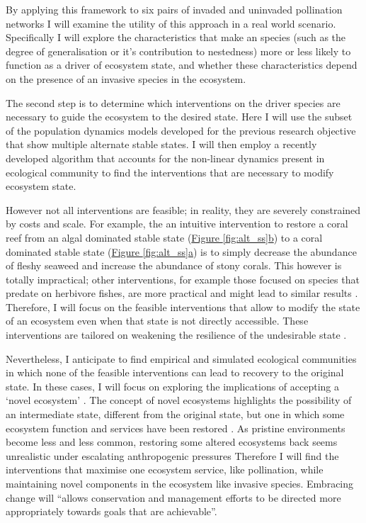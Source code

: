 \documentclass[a4paper]{article}
\begin{document}
By applying this framework to six pairs of invaded and uninvaded pollination networks \cite{Bartomeus2008} I will examine the utility of this approach in a real world scenario.
Specifically I will explore the characteristics that make an species (such as the degree of generalisation or it's contribution to nestedness) more or less likely to function as a driver of ecosystem state, and whether these characteristics depend on the presence of an invasive species in the ecosystem.

The second step is to determine which interventions on the driver species are necessary to guide the ecosystem to the desired state.
Here I will use the subset of the population dynamics models developed for the previous research objective that show multiple alternate stable states.
I will then employ a recently developed algorithm that accounts for the non-linear dynamics present in ecological community \cite{Cornelius2013, Cornelius2013a} to find the interventions that are necessary to modify ecosystem state.

However not all interventions are feasible; in reality, they are severely constrained by costs and scale.
For example, the an intuitive intervention to restore a coral reef from an algal dominated stable state (\hyperref[fig:alt_ss]{Figure \ref{fig:alt_ss}b}) to a coral dominated stable state (\hyperref[fig:alt_ss]{Figure \ref{fig:alt_ss}a}) is to simply decrease the abundance of fleshy seaweed and increase the abundance of stony corals.
This however is totally impractical; other interventions, for example those focused on species that predate on herbivore fishes, are more practical and might lead to similar results \cite{Bennett2015}.
Therefore, I will focus on the feasible interventions that allow to modify the state of an ecosystem even when that state is not directly accessible.
These interventions are tailored on weakening the resilience of the undesirable state \cite{Graham2013a, Standish2014a, Selkoe2015}.

Nevertheless, I anticipate to find empirical and simulated ecological communities in which none of the feasible interventions can lead to recovery to the original state.
In these cases, I will focus on exploring the implications of accepting a `novel ecosystem' \cite{Hobbs2006}.
The concept of novel ecosystems highlights the possibility of an intermediate state, different from the original state, but one in which some ecosystem function and services have been restored \cite{Graham2014a, Graham2015a}.
As pristine environments become less and less common, restoring some altered ecosystems back seems unrealistic under escalating anthropogenic pressures \cite{Graham2015a}
Therefore I will find the interventions that maximise one ecosystem service, like pollination, while maintaining novel components in the ecosystem like invasive species.
Embracing change will ``allows conservation and management efforts to be directed more appropriately towards goals that are achievable''\cite{Graham2014a}.
\end{document}
